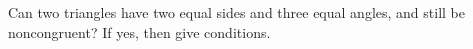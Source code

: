 Can two triangles have two equal sides and three equal angles, and still be noncongruent? If yes, then give conditions.
